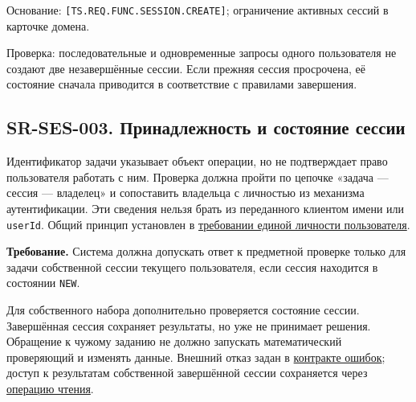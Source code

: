 \documentclass[12pt,a4paper]{article}
\begin{document}
Основание: \texttt{[TS.\allowbreak{}REQ.\allowbreak{}FUNC.\allowbreak{}SESSION.\allowbreak{}CREATE]}; ограничение активных сессий в карточке домена.

Проверка: последовательные и одновременные запросы одного пользователя не создают две незавершённые сессии. Если прежняя сессия просрочена, её состояние сначала приводится в соответствие с правилами завершения.

\subsection{SR-SES-003. Принадлежность и состояние сессии}\label{sr-ses-003-ux43fux440ux438ux43dux430ux434ux43bux435ux436ux43dux43eux441ux442ux44c-ux438-ux441ux43eux441ux442ux43eux44fux43dux438ux435-ux441ux435ux441ux441ux438ux438}

\hypertarget{sr-ses-003-принадлежность-и-состояние-сессии}{}

Идентификатор задачи указывает объект операции, но не подтверждает право пользователя работать с ним. Проверка должна пройти по цепочке «задача --- сессия --- владелец» и сопоставить владельца с личностью из механизма аутентификации. Эти сведения нельзя брать из переданного клиентом имени или \texttt{userId}. Общий принцип установлен в \hyperref[sr-sys-001-ux435ux434ux438ux43dux430ux44f-ux43bux438ux447ux43dux43eux441ux442ux44c-ux43fux43eux43bux44cux437ux43eux432ux430ux442ux435ux43bux44f]{требовании единой личности пользователя}.

\textbf{Требование.} Система должна допускать ответ к предметной проверке только для задачи собственной сессии текущего пользователя, если сессия находится в состоянии \texttt{NEW}.

Для собственного набора дополнительно проверяется состояние сессии. Завершённая сессия сохраняет результаты, но уже не принимает решения. Обращение к чужому заданию не должно запускать математический проверяющий и изменять данные. Внешний отказ задан в \href{../07_\%D0\%9F\%D1\%80\%D0\%BE\%D0\%B3\%D1\%80\%D0\%B0\%D0\%BC\%D0\%BC\%D0\%BD\%D1\%8B\%D0\%B5_\%D1\%82\%D1\%80\%D0\%B5\%D0\%B1\%D0\%BE\%D0\%B2\%D0\%B0\%D0\%BD\%D0\%B8\%D1\%8F/DOC-06.2_\%D0\%A1\%D0\%B5\%D1\%81\%D1\%81\%D0\%B8\%D0\%B8_\%D0\%B7\%D0\%B0\%D0\%B4\%D0\%B0\%D1\%87_\%D0\%B8_\%D0\%BF\%D0\%BB\%D0\%B0\%D0\%BD\%D0\%B8\%D1\%80\%D0\%BE\%D0\%B2\%D1\%89\%D0\%B8\%D0\%BA.pdf\#nameddest=\%D0\%BA\%D0\%BE\%D0\%B4\%D1\%8B-\%D0\%B8-\%D0\%BF\%D1\%80\%D0\%B5\%D0\%B4\%D1\%81\%D1\%82\%D0\%B0\%D0\%B2\%D0\%BB\%D0\%B5\%D0\%BD\%D0\%B8\%D0\%B5-\%D0\%BE\%D1\%88\%D0\%B8\%D0\%B1\%D0\%BE\%D0\%BA}{контракте ошибок}; доступ к результатам собственной завершённой сессии сохраняется через \hyperref[sr-ses-014-ux43fux43eux43bux443ux447ux435ux43dux438ux435-ux441ux43eux445ux440ux430ux43dux451ux43dux43dux43eux433ux43e-ux440ux435ux437ux443ux43bux44cux442ux430ux442ux430]{операцию чтения}.
\end{document}
